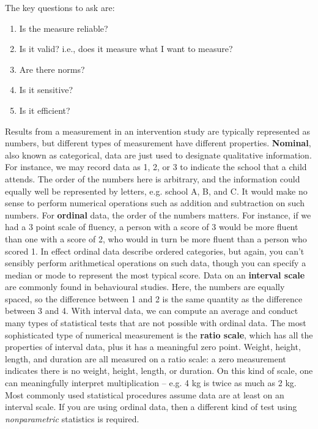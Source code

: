 \documentclass{krantz}
\providecommand{\tightlist}{%
\setlength{\itemsep}{0pt}\setlength{\parskip}{0pt}}
\begin{document}
The key questions to ask are:

\begin{enumerate}
\def\labelenumi{\arabic{enumi}.}
\tightlist
\item
  Is the measure reliable?
\item
  Is it valid? i.e., does it measure what I want to measure?
\item
  Are there norms?
\item
  Is it sensitive?
\item
  Is it efficient?
\end{enumerate}

\begin{tcolorbox}[colback=Black!5!lightgray,colframe=black!75!black,coltitle=white,title=Types of numerical measurement]\label{box:numerical}
Results from a measurement in an intervention study are typically represented as numbers, but different types of measurement have different properties. \textbf{Nominal}, also known as categorical, data are just used to designate qualitative information. For instance, we may record data as 1, 2, or 3 to indicate the school that a child attends. The order of the numbers here is arbitrary, and the information could equally well be represented by letters, e.g. school A, B, and C. It would make no sense to perform numerical operations such as addition and subtraction on such numbers.  
For \textbf{ordinal} data, the order of the numbers matters. For instance, if we had a 3 point scale of fluency, a person with a score of 3 would be more fluent than one with a score of 2, who would in turn be more fluent than a person who scored 1. In effect ordinal data describe ordered categories, but again, you can't sensibly perform arithmetical operations on such data, though you can specify a median or mode to represent the most typical score.   
Data on an \textbf{interval scale}  are commonly found in behavioural studies. Here, the numbers are equally spaced, so the difference between 1 and 2 is the same quantity as the difference between 3 and 4. With interval data, we can compute an average and conduct many types of statistical tests that are not possible with ordinal data.  
The most sophisticated type of numerical measurement is the \textbf{ratio scale}, which has all the properties of interval data, plus it has a meaningful zero point. Weight, height, length, and duration are all measured on a ratio scale: a zero measurement indicates there is no weight, height, length, or duration. On this kind of scale, one can meaningfully interpret multiplication -- e.g. 4 kg is twice as much as 2 kg. 
Most commonly used statistical procedures assume data are at least on an interval scale. If you are using ordinal data, then a different kind of test using \textit{nonparametric} statistics is required.
\end{tcolorbox}
\end{document}
